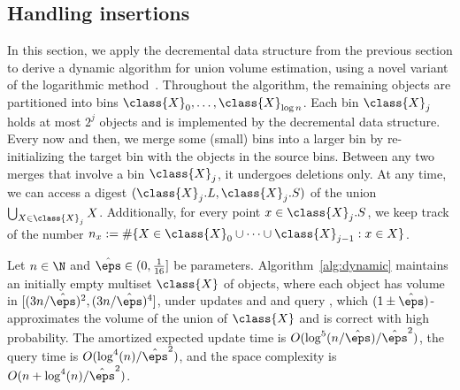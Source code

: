 \subsection{Handling insertions}
In this section, we apply the decremental data structure from the previous section to derive a dynamic algorithm for union volume estimation, using a novel variant of the logarithmic method~\cite{BS80}. Throughout the algorithm, the remaining objects are partitioned into bins $\class{X}_0, \dots, \class{X}_{\log n}$. Each bin $\class{X}_j$ holds at most $2^j$ objects and is implemented by the decremental data structure. Every now and then, we merge some (small) bins into a larger bin by re-initializing the target bin with the objects in the source bins. Between any two merges that involve a bin $\class{X}_j$, it undergoes deletions only. At any time, we can access a digest $(\class{X}_j.L, \class{X}_j.S)$ of the union $\bigcup_{X \in \class{X}_j} X$. Additionally, for every point $x \in \class{X}_j.S$, we keep track of the number $n_x := \#\{ X \in \class{X}_0 \cup \cdots \cup \class{X}_{j-1} : x \in X \}$.
%
\begin{theorem}\label{thm:dynamicintermediate}
    Let $n \in \N$ and $\hat \eps \in (0,\frac{1}{16}]$ be parameters. 
    Algorithm~\ref{alg:dynamic} maintains an initially empty multiset $\class{X}$ of objects, where each object has volume in $[(3n/\hat \eps)^2, (3n/\hat \eps)^4]$, under updates  and  and query \est{}, which $(1\pm\hat \eps)$-approximates the volume of the union of $\class{X}$ and is correct with high probability. The amortized expected update time is $O(\log^5(n/\hat \eps)/\hat \eps^2)$, the query time is $O(\log^4(n)/\hat \eps^2)$, and the space complexity is $O(n + \log^4(n)/\hat \eps^2)$.
\end{theorem}
%
%
